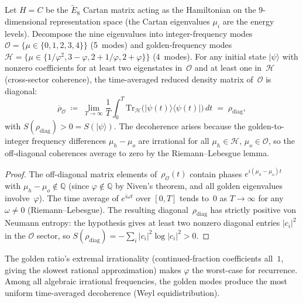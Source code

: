 \begin{theorem}\label{thm:decoherence}
Let $H = C$ be the $\tilde{E}_8$ Cartan matrix acting as the Hamiltonian
on the $9$-dimensional representation space
(the Cartan eigenvalues $\mu_i$ are the energy levels).
Decompose the nine eigenvalues into integer-frequency modes
$\mathcal{O} = \{\mu \in \{0, 1, 2, 3, 4\}\}$ (5~modes) and
golden-frequency modes
$\mathcal{H} = \{\mu \in \{1/\varphi^2, 3{-}\varphi, 2{+}1/\varphi, 2{+}\varphi\}\}$ (4~modes).
For any initial state $|\psi\rangle$ with nonzero coefficients
for at least two eigenstates in~$\mathcal{O}$ and at least one
in~$\mathcal{H}$ (cross-sector coherence),
the time-averaged reduced density matrix of~$\mathcal{O}$ is diagonal:
\[
  \overline{\rho}_{\mathcal{O}}
  \;\coloneqq\;
  \lim_{T\to\infty} \frac{1}{T} \int_0^T
  \mathrm{Tr}_{\mathcal{H}}\bigl(|\psi(t)\rangle\langle\psi(t)|\bigr)\,dt
  \;=\; \rho_{\mathrm{diag}},
\]
with $S(\rho_{\mathrm{diag}}) > 0 = S(|\psi\rangle)$.
The decoherence arises because the golden-to-integer frequency differences
$\mu_h - \mu_o$ are irrational for all $\mu_h \in \mathcal{H}$,
$\mu_o \in \mathcal{O}$, so the off-diagonal coherences average to zero
by the Riemann--Lebesgue lemma.
\end{theorem}

\begin{proof}
The off-diagonal matrix elements of~$\rho_\mathcal{O}(t)$ contain
phases $e^{i(\mu_h - \mu_o)t}$ with $\mu_h - \mu_o \notin \mathbb{Q}$
(since $\varphi \notin \mathbb{Q}$ by Niven's theorem, and
all golden eigenvalues involve~$\varphi$).
The time average of $e^{i\omega t}$ over $[0,T]$ tends to~$0$
as $T \to \infty$ for any $\omega \neq 0$ (Riemann--Lebesgue).
The resulting diagonal~$\rho_{\mathrm{diag}}$ has strictly positive
von Neumann entropy: the hypothesis gives at least two nonzero
diagonal entries $|c_i|^2$ in the $\mathcal{O}$ sector, so
$S(\rho_{\mathrm{diag}}) = -\sum_i |c_i|^2\log|c_i|^2 > 0$.
\end{proof}

\begin{remark}
The golden ratio's extremal irrationality (continued-fraction
coefficients all~$1$, giving the slowest rational approximation)
makes $\varphi$ the worst-case for recurrence.  Among all algebraic
irrational frequencies, the golden modes produce the most uniform
time-averaged decoherence (Weyl equidistribution).
\end{remark}

